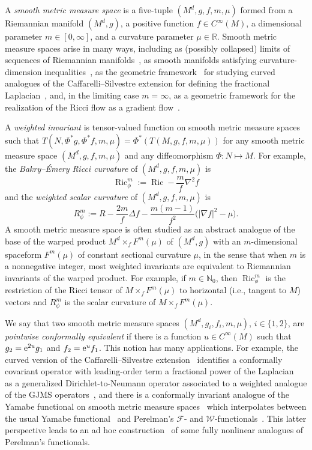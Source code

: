 \documentclass[pdftex]{sigma}
\DeclareMathOperator{\Ric}{Ric}
\newcommand{\lv}{\lvert}
\newcommand{\rv}{\rvert}
\newcommand{\mF}{\mathcal{F}}
\newcommand{\mW}{\mathcal{W}}
\newcommand{\bN}{\mathbb{N}}
\newcommand{\bR}{\mathbb{R}}
\numberwithin{equation}{section}
\begin{document}
A \emph{smooth metric measure space} is a five-tuple $(M^d,g,f,m,\mu)$ formed from a Riemannian manifold $(M^d,g)$, a positive function $f\in C^\infty(M)$, a dimensional parameter $m\in[0,\infty]$, and a curvature parameter $\mu\in\bR$. Smooth metric measure spaces arise in many ways, including as (possibly collapsed) limits of sequences of Riemannian manifolds~\cite{CheegerColding2000a}, as smooth manifolds satisfying curvature-dimension inequalities~\cite{BakryEmery1985,Wei_Wylie}, as the geometric framework~\cite{CaseChang2013} for studying curved analogues of the Caffarelli--Silvestre extension for defining the fractional Laplacian~\cite{CaffarelliSilvestre2007}, and, in the limiting case $m=\infty$, as a geometric framework for the realization of the Ricci flow as a gradient flow~\cite{Perelman1}.


A \emph{weighted invariant} is tensor-valued function on smooth metric measure spaces such that $T(N,\Phi^\ast g,\Phi^\ast f,m,\mu) \!=\! \Phi^\ast(T(M,g,f,m,\mu))$ for any smooth metric measure space $(M^d,g,f,m,\mu)$ and any diffeomorphism $\Phi \colon N \mapsto M$.
For example, the \emph{Bakry--\'Emery Ricci curvature} of $(M^d,g,f,m,\mu)$ is
\begin{equation*}
 \Ric_\phi^m := \Ric - \frac{m}{f}\nabla^2f
\end{equation*}
and the \emph{weighted scalar curvature} of $(M^d,g,f,m,\mu)$ is
\begin{equation*}
 R_\phi^m := R - \frac{2m}{f}\Delta f - \frac{m(m-1)}{f^2}\bigl( \lv\nabla f\rv^2 - \mu \bigr) .
\end{equation*}
A smooth metric measure space is often studied as an abstract analogue of the base of the warped product $M^d \times_f F^m(\mu)$ of $(M^d,g)$ with an $m$-dimensional spaceform $F^m(\mu)$ of constant sectional curvature $\mu$, in the sense that when $m$ is a nonnegative integer, most weighted invariants are equivalent to Riemannian invariants of the warped product.
For example, if $m \in \bN_0$, then $\Ric_\phi^m$ is the restriction of the Ricci tensor of $M \times_f F^m(\mu)$ to horizontal (i.e., tangent to $M$) vectors and $R_\phi^m$ is the scalar curvature of $M \times_f F^m(\mu)$.


We say that two smooth metric measure spaces $(M^d,g_i,f_i,m,\mu)$, $i\in\{1,2\}$, are \emph{pointwise conformally equivalent} if there is a function $u\in C^\infty(M)$ such that $g_2={\rm e}^{2u}g_1$ and $f_2={\rm e}^uf_1$.
This notion has many applications. For example, the curved version of the Caffarelli--Silvestre extension~\cite{CaffarelliSilvestre2007,Case2019tr, CaseChang2013} identifies a conformally covariant operator with leading-order term a fractional power of the Laplacian~\cite{GrahamZworski2003} as a generalized Dirichlet-to-Neumann operator associated to a weighted analogue of the GJMS operators~\cite{Case2011t, CaseChang2013}, and there is a conformally invariant analogue of the Yamabe functional on smooth metric measure spaces~\cite{Case2013y} which interpolates between the usual Yamabe functional~\cite{Yamabe1960} and Perelman's $\mF$- and $\mW$-functionals~\cite{Perelman1}.
This latter perspective leads to an ad hoc construction~\cite{Case2014sd,Case2016v, Case2014s} of some fully nonlinear analogues of Perelman's functionals.
\end{document}
